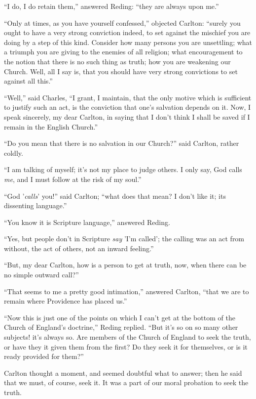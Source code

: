 ``I do, I do retain them,'' answered Reding: ``they are
always upon me.''

``Only at times, as you have yourself confessed,'' objected
Carlton: ``surely you ought to have a very strong conviction
indeed, to set against the mischief you are doing by a step of
this kind. Consider how many persons you are unsettling; what a
triumph you are giving to the enemies of all religion; what
encouragement to the notion that there is no such thing as truth; how
you are weakening our Church. Well, all I say is, that you should have
very strong convictions to set against all this.''

``Well,'' said Charles, ``I grant, I maintain, that the
only motive which is sufficient to justify such an act, is the
conviction that one's salvation depends on it. Now, I speak sincerely,
my dear Carlton, in saying that I don't think I shall be saved if I
remain in the English Church.''

``Do you mean that there is no salvation in our Church?''
said Carlton, rather coldly.

``I am talking of myself; it's not my place to judge others. I
only say, God calls \emph{me}, and I must follow at the risk of my
soul.''

``God '\emph{calls}' you!'' said Carlton; ``what does
that mean? I don't like it; its dissenting language.''

``You know it is Scripture language,'' answered Reding.

``Yes, but people don't in Scripture \emph{say} 'I'm called';
the calling was an act from without, the act of others, not an inward
feeling.''

``But, my dear Carlton, how is a person to get at truth, now,
when there can be no simple outward call?''

``That seems to me a pretty good intimation,'' answered
Carlton, ``that we are to remain where Providence has placed
us.''

``Now this is just one of the points on which I can't get at
the bottom of the Church of England's doctrine,'' Reding replied.
``But it's so on so many other subjects! it's always so. Are
members of the Church of England to seek the truth, or have they it
given them from the first? Do they seek it for themselves, or is it
ready provided for them?''

Carlton thought a moment, and seemed doubtful what to answer; then
he said that we must, of course, seek it. It was a part of our moral
probation to seek the truth.

